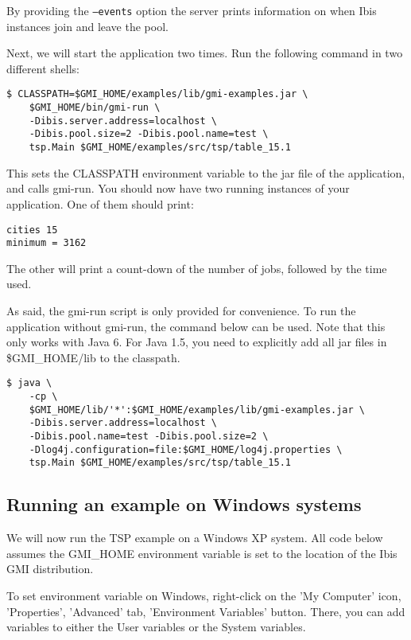 \documentclass[a4paper,10pt]{article}
\begin{document}
By providing the \texttt{--events} option the server
prints information on when Ibis instances join and leave the pool.

Next, we will start the application two times.
Run the following command in two different shells:

\noindent
{\small
\begin{verbatim}
$ CLASSPATH=$GMI_HOME/examples/lib/gmi-examples.jar \
    $GMI_HOME/bin/gmi-run \
    -Dibis.server.address=localhost \
    -Dibis.pool.size=2 -Dibis.pool.name=test \
    tsp.Main $GMI_HOME/examples/src/tsp/table_15.1
\end{verbatim}
}
\noindent

This sets the CLASSPATH environment variable to the jar file of the
application, and calls gmi-run. You should now have two running
instances of your application. One of them should print:

\noindent
{\small
\begin{verbatim}
cities 15
minimum = 3162
\end{verbatim}
}
\noindent

The other will print a count-down of the number of jobs, followed by the
time used.

As said, the gmi-run script is only provided for convenience. To run
the application without gmi-run, the command below can be used.
Note that this only works with Java 6. For Java 1.5, you need to
explicitly add all jar files in \$GMI\_HOME/lib to the classpath.

\noindent
{\small
\begin{verbatim}
$ java \
    -cp \
    $GMI_HOME/lib/'*':$GMI_HOME/examples/lib/gmi-examples.jar \
    -Dibis.server.address=localhost \
    -Dibis.pool.name=test -Dibis.pool.size=2 \
    -Dlog4j.configuration=file:$GMI_HOME/log4j.properties \
    tsp.Main $GMI_HOME/examples/src/tsp/table_15.1
\end{verbatim}
}
\noindent

\subsection{Running an example on Windows systems}

We will now run the TSP example on a Windows XP system.
All code below assumes the GMI\_HOME
environment variable is set to the location of the Ibis GMI distribution.

To set environment variable on Windows, right-click on the 'My Computer' icon,
'Properties', 'Advanced' tab, 'Environment Variables' button. There, you
can add variables to either the User variables or the System variables.
\end{document}

